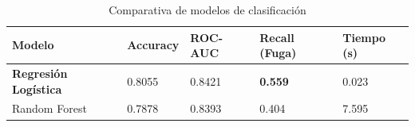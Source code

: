 
\begin{table}[h]
    \centering
    \caption{Comparativa de modelos de clasificación}
    \begin{tabular}{L{4cm}|C{1.8cm}|C{1.8cm}|C{2.2cm}|C{1.8cm}}
        \toprule
        \textbf{Modelo} & \textbf{Accuracy} & \textbf{ROC-AUC} & \textbf{Recall (Fuga)} & \textbf{Tiempo (s)} \\
        \midrule
        \textbf{Regresión Logística} & 0.8055 & 0.8421 & \textbf{0.559} & 0.023 \\
        Random Forest & 0.7878 & 0.8393 & 0.404 & 7.595 \\
        \bottomrule
    \end{tabular}
\end{table}